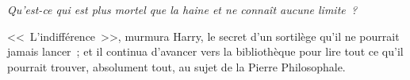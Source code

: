 \emph{Qu'est-ce qui est plus mortel que la haine et ne connaît aucune limite~?}

<<~L'indifférence~>>, murmura Harry, le secret d'un sortilège qu'il ne pourrait jamais lancer~; et il continua d'avancer vers la bibliothèque pour lire tout ce qu'il pourrait trouver, absolument tout, au sujet de la Pierre Philosophale.

